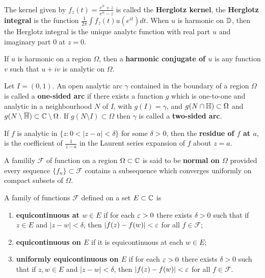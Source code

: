 \documentclass[12pt]{article}
\begin{document}
\begin{definition}
    The kernel given by $f_z(t)=\frac{e^{it}+z}{e^{it}-z}$ is called the \textbf{Herglotz kernel}, the \textbf{Herglotz integral} is the function $\frac{1}{2\pi}\int f_z(t)u(e^{it})dt$. When $u$ is harmonic on $\mathbb{D}$, then the Herglotz integral is the unique analytc function with real part $u$ and imaginary part $0$ at $z=0$.
\end{definition}

\begin{definition}
    If $u$ is harmonic on a region $\Omega$, then a \textbf{harmonic conjugate of $u$} is any function $v$ such that $u+iv$ is analytic on $\Omega$.
\end{definition}

\begin{definition}
    Let $I=(0,1)$. An open analytic arc $\gamma$ contained in the boundary of a region $\Omega$ is called a \textbf{one-sided arc} if there exists a function $g$ which is one-to-one and analytic in a neighbourhood $N$ of $I$, with $g(I)=\gamma$, and $g(N\cap \mathbb{H})\subset\Omega$ and $g(N\setminus \overline{\mathbb{H}})\subset \mathbb{C}\setminus\Omega$. If $g(N\setminus I)\subset\Omega$ then $\gamma$ is called a \textbf{two-sided arc}.
\end{definition}

\begin{definition}
    If $f$ is analytic in $\{z:0<|z-a|<\delta\}$ for some $\delta>0$, then the \textbf{residue of $f$ at $a$}, is the coefficient of $\frac{1}{z-a}$ in the Laurent series expansion of $f$ about $z=a$. 
\end{definition}

\begin{definition}
    A familily $\mathcal{F}$ of function on a region $\Omega\subset\mathbb{C}$ is said to be \textbf{normal on $\Omega$} provided every sequence $\{f_n\}\subset\mathcal{F}$ contains a subsequence which converges uniformly on compact subsets of $\Omega$.
\end{definition}
\newpage
\begin{definition}
    A family of functions $\mathcal{F}$ defined on a set $E\subset\mathbb{C}$ is
    \begin{enumerate}[label=(\alph*)]
        \item \textbf{equicontinuous at $w\in E$} if for each $\varepsilon>0$ there exists $\delta>0$ such that if $z\in E$ and $|z-w|<\delta$, then $|f(z)-f(w)|<\varepsilon$ for all $f\in\mathcal{F}$;
        \item \textbf{equicontinuous on $E$} if it is equicontinuous at each $w\in E$;
        \item \textbf{uniformly equicontinuous on $E$} if for each $\varepsilon>0$ there exists $\delta>0$ such that if $z,w\in E$ and $|z-w|<\delta$, then $|f(z)-f(w)|<\varepsilon$ for all $f\in\mathcal{F}$.
    \end{enumerate}
\end{definition}
\end{document}
